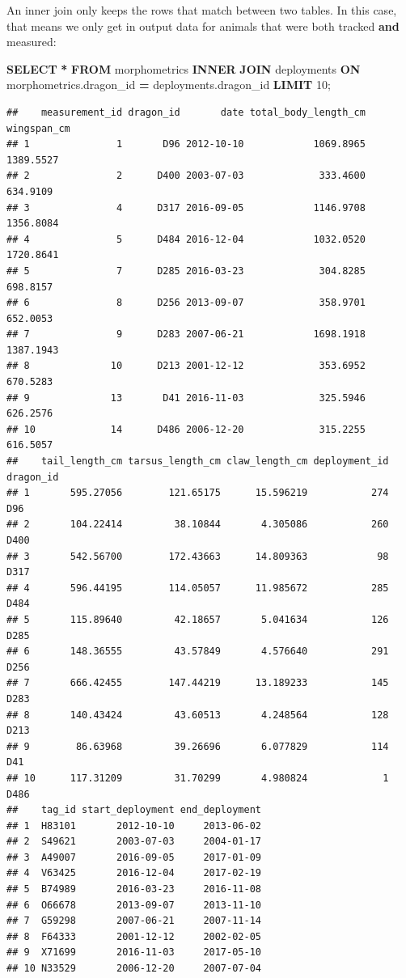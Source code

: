 \documentclass[
]{book}
\newenvironment{Shaded}{\begin{snugshade}}{\end{snugshade}}
\newcommand{\DecValTok}[1]{\textcolor[rgb]{0.00,0.00,0.81}{#1}}
\newcommand{\KeywordTok}[1]{\textcolor[rgb]{0.13,0.29,0.53}{\textbf{#1}}}
\newcommand{\NormalTok}[1]{#1}
\newcommand{\OperatorTok}[1]{\textcolor[rgb]{0.81,0.36,0.00}{\textbf{#1}}}
\begin{document}
An inner join only keeps the rows that match between two tables. In this case,
that means we only get in output data for animals that were both tracked \textbf{and}
measured:

\begin{Shaded}
\begin{Highlighting}[]
\KeywordTok{SELECT} \OperatorTok{*}
\KeywordTok{FROM}\NormalTok{ morphometrics}
\KeywordTok{INNER} \KeywordTok{JOIN}\NormalTok{ deployments }
\KeywordTok{ON}\NormalTok{ morphometrics.dragon\_id }\OperatorTok{=}\NormalTok{ deployments.dragon\_id }
\KeywordTok{LIMIT} \DecValTok{10}\NormalTok{;}
\end{Highlighting}
\end{Shaded}

\begin{verbatim}
##    measurement_id dragon_id       date total_body_length_cm wingspan_cm
## 1               1       D96 2012-10-10            1069.8965   1389.5527
## 2               2      D400 2003-07-03             333.4600    634.9109
## 3               4      D317 2016-09-05            1146.9708   1356.8084
## 4               5      D484 2016-12-04            1032.0520   1720.8641
## 5               7      D285 2016-03-23             304.8285    698.8157
## 6               8      D256 2013-09-07             358.9701    652.0053
## 7               9      D283 2007-06-21            1698.1918   1387.1943
## 8              10      D213 2001-12-12             353.6952    670.5283
## 9              13       D41 2016-11-03             325.5946    626.2576
## 10             14      D486 2006-12-20             315.2255    616.5057
##    tail_length_cm tarsus_length_cm claw_length_cm deployment_id dragon_id
## 1       595.27056        121.65175      15.596219           274       D96
## 2       104.22414         38.10844       4.305086           260      D400
## 3       542.56700        172.43663      14.809363            98      D317
## 4       596.44195        114.05057      11.985672           285      D484
## 5       115.89640         42.18657       5.041634           126      D285
## 6       148.36555         43.57849       4.576640           291      D256
## 7       666.42455        147.44219      13.189233           145      D283
## 8       140.43424         43.60513       4.248564           128      D213
## 9        86.63968         39.26696       6.077829           114       D41
## 10      117.31209         31.70299       4.980824             1      D486
##    tag_id start_deployment end_deployment
## 1  H83101       2012-10-10     2013-06-02
## 2  S49621       2003-07-03     2004-01-17
## 3  A49007       2016-09-05     2017-01-09
## 4  V63425       2016-12-04     2017-02-19
## 5  B74989       2016-03-23     2016-11-08
## 6  O66678       2013-09-07     2013-11-10
## 7  G59298       2007-06-21     2007-11-14
## 8  F64333       2001-12-12     2002-02-05
## 9  X71699       2016-11-03     2017-05-10
## 10 N33529       2006-12-20     2007-07-04
\end{verbatim}
\end{document}

